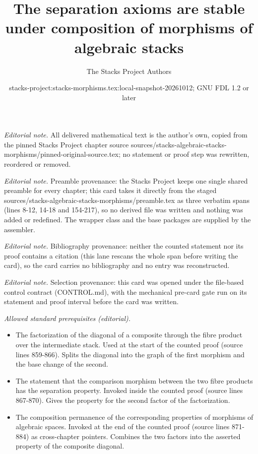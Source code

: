 \documentclass[10pt,a4paper]{amsart}
\title{The separation axioms are stable under composition of morphisms of algebraic stacks}
\author{The Stacks Project Authors}
\date{stacks-project:stacks-morphisms.tex:local-snapshot-20261012; GNU FDL 1.2 or later}
\theoremstyle{plain}
\theoremstyle{definition}
\theoremstyle{remark}
\numberwithin{equation}{subsection}
\begin{document}
\maketitle
\noindent\textit{Editorial note.} All delivered mathematical text is the author's own, copied from the pinned Stacks Project chapter source sources/stacks-algebraic-stacks-morphisms/pinned-original-source.tex; no statement or proof step was rewritten, reordered or removed.\par\medskip
\noindent\textit{Editorial note.} Preamble provenance: the Stacks Project keeps one single shared preamble for every chapter; this card takes it directly from the staged sources/stacks-algebraic-stacks-morphisms/preamble.tex as three verbatim spans (lines 8-12, 14-18 and 154-217), so no derived file was written and nothing was added or redefined. The wrapper class and the base packages are supplied by the assembler.\par\medskip
\noindent\textit{Editorial note.} Bibliography provenance: neither the counted statement nor its proof contains a citation (this lane rescans the whole span before writing the card), so the card carries no bibliography and no entry was reconstructed.\par\medskip
\noindent\textit{Editorial note.} Selection provenance: this card was opened under the file-based control contract (CONTROL.md), with the mechanical pre-card gate run on its statement and proof interval before the card was written.\par\medskip
\noindent\textit{Allowed standard prerequisites (editorial).}\begin{itemize}
\item The factorization of the diagonal of a composite through the fibre product over the intermediate stack. Used at the start of the counted proof (source lines 859-866). Splits the diagonal into the graph of the first morphism and the base change of the second.
\item The statement that the comparison morphism between the two fibre products has the separation property. Invoked inside the counted proof (source lines 867-870). Gives the property for the second factor of the factorization.
\item The composition permanence of the corresponding properties of morphisms of algebraic spaces. Invoked at the end of the counted proof (source lines 871-884) as cross-chapter pointers. Combines the two factors into the asserted property of the composite diagonal.
\end{itemize}\medskip
\end{document}
